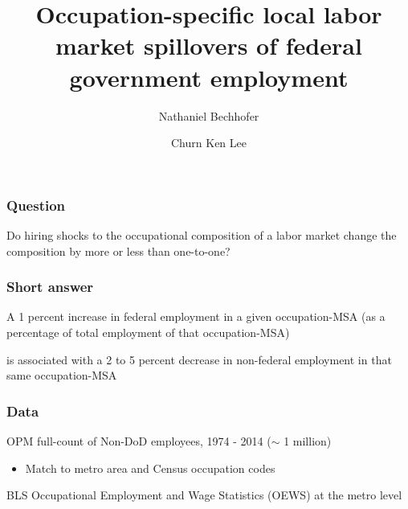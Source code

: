 \documentclass[aspectratio=169]{beamer}
\title{Occupation-specific local labor market spillovers of federal government employment}
\author{Nathaniel Bechhofer \and Churn Ken Lee}
\institute{UC San Diego}
\date{}
\newenvironment{wideitemize}{\itemize\addtolength{\itemsep}{10pt}}{\enditemize}
\begin{document}
\begin{frame}
    \titlepage
\end{frame}

\begin{frame}
    \frametitle{Question}

    Do hiring shocks to the occupational composition of a labor market change the composition by more or less than one-to-one? 

\end{frame}

\begin{frame}
    \frametitle{Short answer}

    \begin{wideitemize}
        \item A 1 percent increase in federal employment in a given occupation-MSA (as a percentage of total employment of that occupation-MSA)
        \item is associated with a 2 to 5 percent decrease in non-federal employment in that same occupation-MSA
    \end{wideitemize}

\end{frame}

\begin{frame}
    \frametitle{Data}

    \begin{wideitemize}
        \item OPM full-count of Non-DoD employees, 1974 - 2014 ($\sim$ 1 million)
        \begin{itemize}
            \item Match to metro area and Census occupation codes
        \end{itemize}
        \item BLS Occupational Employment and Wage Statistics (OEWS) at the metro level
    \end{wideitemize}

\end{frame}
\end{document}
